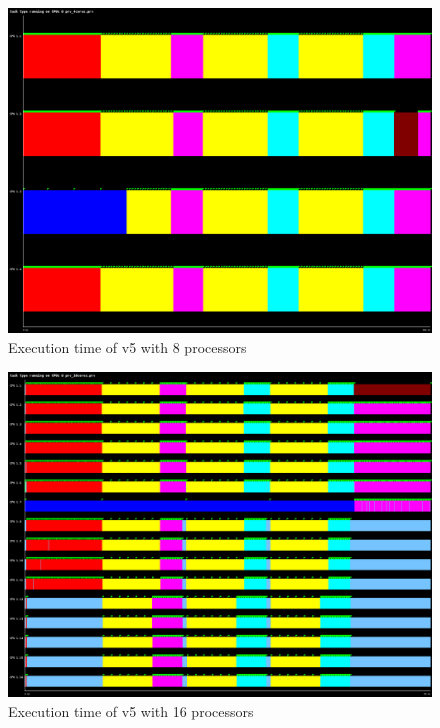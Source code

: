 \begin{figure}[H]%
    \caption{Execution time of v5 with 8 processors}%
    \label{fig:plot_v5_08}
    \centering
    \includegraphics[width=\textwidth]{./data/3dfft_/plots/v5_08.png}
\end{figure}

\begin{figure}[H]%
    \caption{Execution time of v5 with 16 processors}%
    \label{fig:plot_v5_16}
    \centering
    \includegraphics[width=\textwidth]{./data/3dfft_/plots/v5_16.png}
\end{figure}

